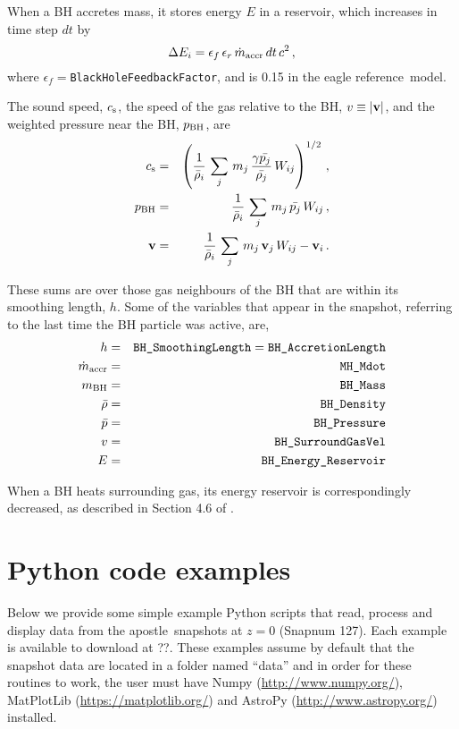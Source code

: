 \documentclass[10pt, a4paper]{article}
\newcommand{\apostle}{{\sc apostle}}
\newcommand{\REF}{{\sc eagle reference}}
\begin{document}
\noindent When a BH accretes mass, it stores energy $E$ in a reservoir, which
increases in time step $dt$ by \begin{equation} \Delta E_i =
\epsilon_f\,\epsilon_r\,\dot m_{\rm accr}\,dt\,c^2\,, \end{equation} where
$\epsilon_f=$\texttt{BlackHoleFeedbackFactor}, and is 0.15 in the \REF\ model.

\noindent The sound speed, $c_{\rm s}$, the speed of the gas relative to the BH,
$v\equiv |{\bf v}|$, and the weighted pressure near the BH, $p_{\rm BH}$, are
\begin{eqnarray} c_{\rm s} &=& \left({1\over\bar{\rho}_i}\, \sum_j\,
m_j\,{\gamma\bar{p_j}\over \bar{\rho_j}}\,W_{ij}\right)^{1/2}\,,\nonumber\\
p_{\rm BH} &=& {1\over\bar{\rho}_i}\, \sum_j\,
m_j\,\bar{p_j}\,W_{ij}\,,\nonumber\\ {\bf v}&=&{1\over\bar{\rho}_i}\, \sum_j\,
m_j\, {\bf v}_j \,W_{ij}-{\bf v}_i\,.  \end{eqnarray}

\noindent These sums are over those gas neighbours of the BH that are within its
smoothing length, $h$. Some of the variables that appear in the snapshot,
referring to the last time the BH particle was active, are, \begin{eqnarray} h
&=&
\hbox{\texttt{BH\_SmoothingLength}}=\hbox{\texttt{BH\_AccretionLength}}\nonumber\\
\dot m_{\rm accr} &=& \hbox{\texttt{MH\_Mdot}}\nonumber\\ m_{\rm BH} &=&
\hbox{\texttt{BH\_Mass}}\nonumber\\ \bar{\rho} &=&
\hbox{\texttt{BH\_Density}}\nonumber\\ \bar{p} &=&
\hbox{\texttt{BH\_Pressure}}\nonumber\\ v &=&
\hbox{\texttt{BH\_SurroundGasVel}}\nonumber\\ E &=&
\hbox{\texttt{BH\_Energy\_Reservoir}}\nonumber\\ \end{eqnarray}

\noindent When a BH heats surrounding gas, its energy reservoir is
correspondingly decreased, as described in Section 4.6 of \cite{2015MNRAS.446..521S}.

\section{Python code examples}
\label{SecPythonExamples}
Below we provide some simple example {\sc Python} scripts that read, process
and display data from the \apostle\ snapshots at $z=0$ ({\sc Snapnum} 127). Each
example is available to download at ??.
These examples assume by default that the snapshot data are located in a folder
named ``data'' and in order for these routines to work, the user must have {\sc
Numpy} ({\color{blue}\href{http://www.numpy.org/}{http://www.numpy.org/}}), {\sc
MatPlotLib}
({\color{blue}\href{https://matplotlib.org/}{https://matplotlib.org/}}) and {\sc
AstroPy} ({\color{blue}\href{http://www.astropy.org/}{http://www.astropy.org/}})
installed.
\end{document}
